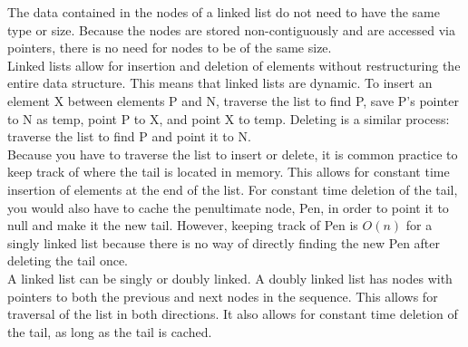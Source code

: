The data contained in the nodes of a linked list do not need to have the same type or size. Because the nodes are stored non-contiguously and are accessed via pointers, there is no need for nodes to be of the same size. \\

Linked lists allow for insertion and deletion of elements without restructuring the entire data structure. This means that linked lists are dynamic. To insert an element X between elements P and N, traverse the list to find P, save P's pointer to N as temp, point P to X, and point X to temp. Deleting is a similar process: traverse the list to find P and point it to N. \\

Because you have to traverse the list to insert or delete, it is common practice to keep track of where the tail is located in memory. This allows for constant time insertion of elements at the end of the list. For constant time deletion of the tail, you would also have to cache the penultimate node, Pen, in order to point it to null and make it the new tail. However, keeping track of Pen is $O(n)$ for a singly linked list because there is no way of directly finding the new Pen after deleting the tail once.\\

A linked list can be singly or doubly linked. A doubly linked list has nodes with pointers to both the previous and next nodes in the sequence. This allows for traversal of the list in both directions. It also allows for constant time deletion of the tail, as long as the tail is cached.

